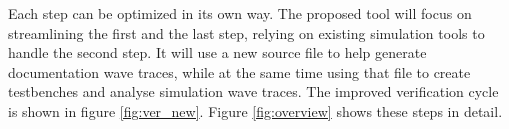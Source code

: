 \npar
{}\noindent
Each step can be optimized in its own way. The proposed tool will focus on streamlining the first and the last step, relying on existing simulation tools to handle the second step. It will use a new source file to help generate documentation wave traces, while at the same time using that file to create testbenches and analyse simulation wave traces. The improved verification cycle is shown in figure \ref{fig:ver_new}. Figure \ref{fig:overview} shows these steps in detail.\nline
{}\nline
